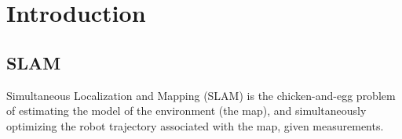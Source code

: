 
\chapter{Introduction} \label{chap:introduction}






% 
\section{SLAM}

Simultaneous Localization and Mapping (SLAM) is the chicken-and-egg problem of estimating the model of the environment (the map), and simultaneously optimizing the robot trajectory associated with the map, given measurements.

